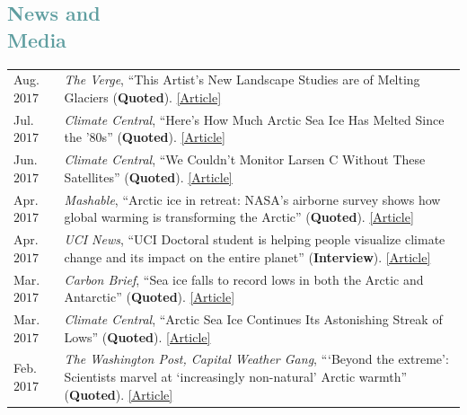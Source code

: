 \documentclass[margin,line,palatino,courier,10pt]{res}
\begin{document}
\begin{resume}
\section{\sc \textcolor{CadetBlue}{\large{News and\\ Media}}}
\vspace*{0.04in}
\begin{tabular}{@{}p{0.8in}p{4in}}
Aug. $2017$ & \textit{The Verge}, ``This Artist's New Landscape Studies are of Melting Glaciers (\textbf{Quoted}). \href{http://sites.uci.edu/zlabe/media-and-outreach/?preview_id=567&preview_nonce=d7dd77fe7a&_thumbnail_id=-1&preview=true}{[Article]}\\
Jul. $2017$ & \textit{Climate Central}, ``Here's How Much Arctic Sea Ice Has Melted Since the '$80$s'' (\textbf{Quoted}). \href{http://www.climatecentral.org/news/arctic-sea-ice-melt-since-the-80s-21637}{[Article]}\\
Jun. $2017$ & \textit{Climate Central}, ``We Couldn't Monitor Larsen C Without These Satellites'' (\textbf{Quoted}). \href{http://www.climatecentral.org/news/larsen-c-monitoring-satellites-21564}{[Article]}\\
Apr. $2017$ & \textit{Mashable}, ``Arctic ice in retreat: NASA's airborne survey shows how global warming is transforming the Arctic'' (\textbf{Quoted}). \href{http://mashable.com/2017/04/13/arctic-meltdown-nasa-photos-changing-ice/?utm_cid=hp-n-1#BgdepWyM6Pq3}{[Article]}\\
Apr. $2017$ & \textit{UCI News}, ``UCI Doctoral student is helping people visualize climate change and its impact on the entire planet'' (\textbf{Interview}). \href{http://grad.uci.edu/news-and-events/student-spotlights/Zachary-Labe.html}{[Article]}\\
Mar. $2017$ & \textit{Carbon Brief}, ``Sea ice falls to record lows in both the Arctic and Antarctic'' (\textbf{Quoted}). \href{https://www.carbonbrief.org/sea-ice-falls-record-lows-arctic-antarctic}{[Article]}\\
Mar. $2017$ & \textit{Climate Central}, ``Arctic Sea Ice Continues Its Astonishing Streak of Lows'' (\textbf{Quoted}). \href{http://www.climatecentral.org/news/arctic-sea-ice-record-low-streak-21227}{[Article]}\\
Feb. $2017$ & \textit{The Washington Post, Capital Weather Gang}, ```Beyond the extreme': Scientists marvel at `increasingly non-natural' Arctic warmth'' (\textbf{Quoted}). \href{https://www.washingtonpost.com/news/capital-weather-gang/wp/2017/02/01/beyond-the-extreme-scientists-marvel-at-increasingly-non-natural-arctic-warmth/?sdfsdfsdfsdfsd&utm_term=.cf3cf81d24f3}{[Article]}\\

\end{tabular}
\end{resume}
\end{document}
